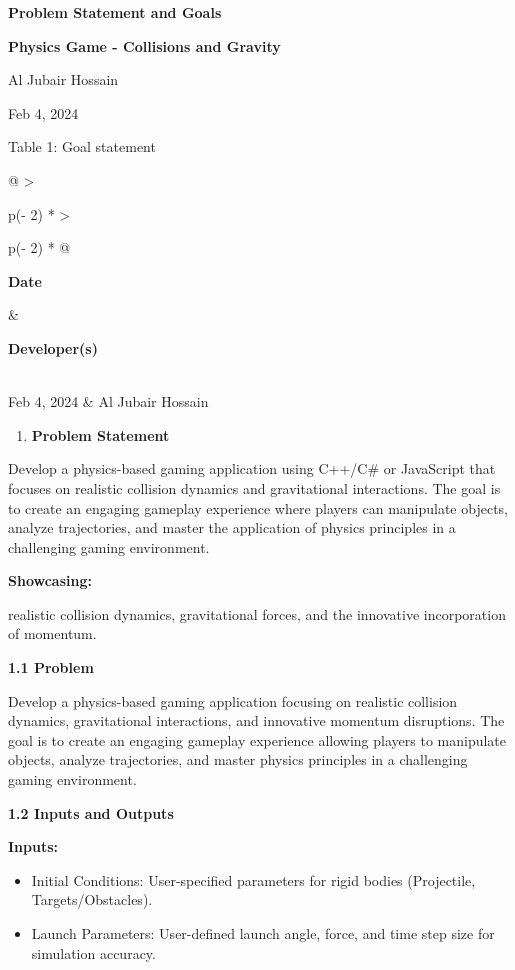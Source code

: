 \documentclass[
]{article}
\author{}
\date{}
\begin{document}
\textbf{Problem Statement and Goals}

\textbf{Physics Game - Collisions and Gravity}

Al Jubair Hossain

Feb 4, 2024

Table 1: Goal statement

\begin{longtable}[]{@{}
  >{\raggedright\arraybackslash}p{(\columnwidth - 2\tabcolsep) * }
  >{\raggedright\arraybackslash}p{(\columnwidth - 2\tabcolsep) * }@{}}
\toprule
\begin{minipage}[b]{\linewidth}\raggedright
\textbf{Date}
\end{minipage} & \begin{minipage}[b]{\linewidth}\raggedright
\textbf{Developer(s)}
\end{minipage} \\
\midrule
\endhead
Feb 4, 2024 & Al Jubair Hossain \\
\bottomrule
\end{longtable}

\begin{enumerate}
\def\labelenumi{\arabic{enumi}.}
\item
  \textbf{Problem Statement}
\end{enumerate}

Develop a physics-based gaming application using C++/C\# or JavaScript
that focuses on realistic collision dynamics and gravitational
interactions. The goal is to create an engaging gameplay experience
where players can manipulate objects, analyze trajectories, and master
the application of physics principles in a challenging gaming
environment.

\textbf{Showcasing:}

realistic collision dynamics, gravitational forces, and the innovative
incorporation of momentum.

\textbf{1.1 Problem}

Develop a physics-based gaming application focusing on realistic
collision dynamics, gravitational interactions, and innovative momentum
disruptions. The goal is to create an engaging gameplay experience
allowing players to manipulate objects, analyze trajectories, and master
physics principles in a challenging gaming environment.

\textbf{1.2 Inputs and Outputs}

\textbf{Inputs:}

\begin{itemize}
\item
  Initial Conditions: User-specified parameters for rigid bodies
  (Projectile, Targets/Obstacles).
\item
  Launch Parameters: User-defined launch angle, force, and time step
  size for simulation accuracy.
\end{itemize}
\end{document}
